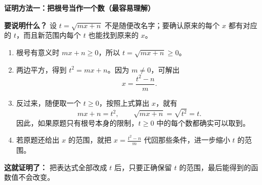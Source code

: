 \clearpage
\begin{proofbox}
  \textbf{\textcolor{CProof}{证明方法一：把根号当作一个数（最容易理解）}}
\begin{center}\end{center}


  \textbf{要说明什么？} 设 $t=\sqrt{mx+n}$ 不是随便改名字；要确认原来的每个 $x$ 都有对应的 $t$，而且新范围内每个 $t$ 也能找到原来的 $x$。

  \begin{enumerate}[leftmargin=*,itemsep=0.5em]
    \item 根号有意义时 $mx+n\ge0$，所以 $t=\sqrt{mx+n}\ge0$。
    \item 两边平方，得到 $t^2=mx+n$。因为 $m\ne0$，可解出
      \[
        x=\frac{t^2-n}{m}.
      \]
    \item 反过来，随便取一个 $t\ge0$，按照上式算出 $x$，就有
      \[
        mx+n=t^2,\qquad \sqrt{mx+n}=\sqrt{t^2}=t.
      \]
      因此，如果原题只有根号本身的限制，$t\ge0$ 中的每个数都确实可以取到。
    \item 若原题还给出 $x$ 的范围，就把 $x=\frac{t^2-n}{m}$ 代回那些条件，进一步缩小 $t$ 的范围。
  \end{enumerate}

  \textbf{这就证明了：} 把表达式全部改成 $t$ 后，只要正确保留 $t$ 的范围，最后能得到的函数值不会改变。

  \medskip
  \end{proofbox}
\clearpage
